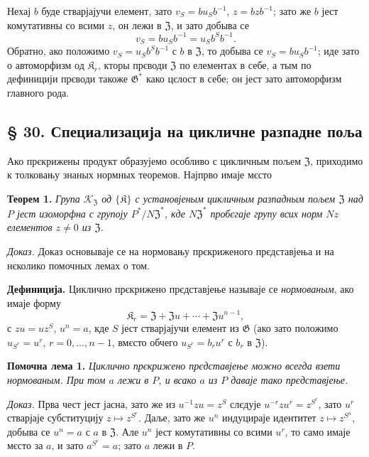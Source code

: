 \documentclass[11pt]{article}
\begin{document}
Нехај \(b\) буде стварјајучи елемент, зато \(v_S=bu_Sb^{-1}\), \(z=bzb^{-1}\); зато же \(b\) јест комутативны со всими \(z\), он лежи в \(\mathfrak Z\), и зато добыва се
\[
v_S=bu_Sb^{-1}=u_Sb^Sb^{-1}.
\]
Обратно, ако положимо \(v_S=u_Sb^Sb^{-1}\) с \(b\) в \(\mathfrak Z\), то добыва се \(v_S=bu_Sb^{-1}\); иде зато о автоморфизм од \(\mathfrak K_r\), кторы прєводи \(\mathfrak Z\) по елементах в себе, а тым по дефиницији прєводи такоже \(\mathfrak G^*\) како цєлост в себе; он јест зато автоморфизм главного рода.

\subsection*{§ 30. Специализација на цикличне разпадне поља}\label{spezialisierung-auf-zyklische-zerfaellungskoerper}

Ако прєкрижены продукт образујемо особливо с цикличным пољем \(\mathfrak Z\), приходимо к толковању знаных нормных теоремов. Најпрво имаје мєсто

\noindent\textbf{Теорем 1.} \emph{Група \(\mathscr K_{\mathfrak Z}\) од \(\{\mathfrak K\}\) с установјеным цикличным разпадным пољем \(\mathfrak Z\) над \(P\) јест изоморфна с групоју \(P^*/N\mathfrak Z^*\), кде \(N\mathfrak Z^*\) пробєгаје групу всих норм \(Nz\) елементов \(z\neq0\) из \(\mathfrak Z\).}

\noindent\emph{Доказ.} Доказ основываје се на нормовању прєкриженого прєдставјења и на нєколико помочных лемах о том.

\noindent\textbf{Дефиниција.} Циклично прєкрижено прєдставјење называје се \emph{нормованым}, ако имаје форму
\[
\mathfrak K_r=\mathfrak Z+\mathfrak Zu+\cdots+\mathfrak Zu^{n-1},
\]
с \(zu=uz^S\), \(u^n=a\), кде \(S\) јест стварјајучи елемент из \(\mathfrak G\) (ако зато положимо \(u_{S^r}=u^r\), \(r=0,\ldots,n-1\), вмєсто обчего \(u_{S^r}=b_ru^r\) с \(b_r\) в \(\mathfrak Z\)).

\noindent\textbf{Помочна лема 1.} \emph{Циклично прєкрижено прєдставјење можно всегда взети нормованым. При том \(a\) лежи в \(P\), и всако \(a\) из \(P\) даваје тако прєдставјење.}

\noindent\emph{Доказ.} Прва чест јест јасна, зато же из \(u^{-1}zu=z^S\) слєдује \(u^{-r}zu^r=z^{S^r}\), зато \(u^r\) стварјаје субституцију \(z\mapsto z^{S^r}\). Даље, зато же \(u^n\) индуцираје идентитет \(z\mapsto z^{S^n}\), добыва се \(u^n=a\) с \(a\) в \(\mathfrak Z\). Але \(u^n\) јест комутативны со всими \(u^r\), то само имаје мєсто за \(a\), и зато \(a^{S^r}=a\); зато \(a\) лежи в \(P\).
\end{document}
